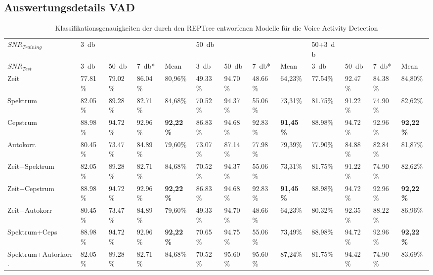 
\begin{appendices}
\begin{landscape}
\chapter{Auswertungsdetails VAD}
\pagestyle{plain}
\begin{table}[h]
\centering
\caption{Klassifikationsgenauigkeiten der durch den REPTree entworfenen Modelle für die Voice Activity Detection}
\label{tab:reptree_results}
\begin{tabular}{@{}lllllllllllll@{}}
\toprule
$SNR_{Training}$ & \SI{3}{\decibel}     &         &         &                  & \SI{50}{\decibel}    &         &         &                  & 50+\SI{3}{\decibel} &        &         &                  \\ 
$SNR_{Test}$     & \SI{3}{\decibel}     & \SI{50}{\decibel}    & \SI{7}{\decibel}*    & Mean             & \SI{3}{\decibel}     & \SI{50}{\decibel}    & \SI{7}{\decibel}*    & Mean             & \SI{3}{\decibel}     & \SI{50}{\decibel}    & \SI{7}{\decibel}*    & Mean             \\ \midrule
Zeit           & 77.81\% & 79.02\% & 86.04\% & 80,96\%          & 49.33\% & 94.70\% & 48.66\% & 64,23\%          & 77.54\% & 92.47\% & 84.38\% & 84,80\%          \\
Spektrum           & 82.05\% & 89.28\% & 82.71\% & 84,68\%          & 70.52\% & 94.37\% & 55.06\% & 73,31\%          & 81.75\% & 91.22\% & 74.90\% & 82,62\%          \\
Cepstrum           & 88.98\% & 94.72\% & 92.96\% & \textbf{92,22\%} & 86.83\% & 94.68\% & 92.83\% & \textbf{91,45\%} & 88.98\% & 94.72\% & 92.96\% & \textbf{92,22\%} \\
Autokorr.           & 80.45\% & 73.47\% & 84.89\% & 79,60\%          & 73.07\% & 87.14\% & 77.98\% & 79,39\%          & 77.90\% & 84.88\% & 82.84\% & 81,87\%          \\
Zeit+Spektrum      & 82.05\% & 89.28\% & 82.71\% & 84,68\%          & 70.52\% & 94.37\% & 55.06\% & 73,31\%          & 81.75\% & 91.22\% & 74.90\% & 82,62\%          \\
Zeit+Cepstrum      & 88.98\% & 94.72\% & 92.96\% & \textbf{92,22\%} & 86.83\% & 94.68\% & 92.83\% & \textbf{91,45\%} & 88.98\% & 94.72\% & 92.96\% & \textbf{92,22\%} \\
Zeit+Autokorr      & 80.45\% & 73.47\% & 84.89\% & 79,60\%          & 49.33\% & 94.70\% & 48.66\% & 64,23\%          & 80.32\% & 92.35\% & 88.22\% & 86,96\%          \\
Spektrum+Ceps      & 88.98\% & 94.72\% & 92.96\% & \textbf{92,22\%} & 70.65\% & 94.75\% & 55.06\% & 73,49\%          & 88.98\% & 94.72\% & 92.96\% & \textbf{92,22\%} \\
Spektrum+Autorkorr.      & 82.05\% & 89.28\% & 82.71\% & 84,68\%          & 70.52\% & 95.60\% & 95.60\% & 87,24\%          & 81.75\% & 94.42\% & 74.90\% & 83,69\%          \\ \bottomrule
\end{tabular}
\end{table}


\end{landscape}
\end{appendices}
